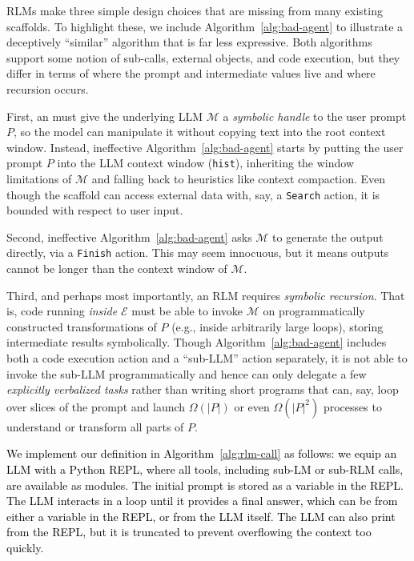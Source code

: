RLMs make three simple design choices that are missing from many existing scaffolds. To highlight these, we include Algorithm~\ref{alg:bad-agent} to illustrate a deceptively ``similar'' algorithm that is far less expressive. Both algorithms support some notion of sub-calls, external objects, and code execution, but they differ in terms of where the prompt and intermediate values live and where recursion occurs.

\begin{table}[htbp]
    \centering
    \begin{minipage}[t]{0.48\textwidth}
        
    \end{minipage}
    \hfill
    \begin{minipage}[t]{0.48\textwidth}
        
    \end{minipage}
\end{table}

First, an \RLM{} must give the underlying LLM $\mathcal{M}$ a \emph{symbolic handle} to the user prompt $P$, so the model can manipulate it without copying text into the root context window. Instead, ineffective Algorithm~\ref{alg:bad-agent} starts by putting the user prompt $P$ into the LLM context window (\texttt{hist}), inheriting the window limitations of $\mathcal{M}$ and falling back to heuristics like context compaction. Even though the scaffold can access external data with, say, a \texttt{Search} action, it is bounded with respect to user input.

Second, ineffective Algorithm~\ref{alg:bad-agent} asks $\mathcal{M}$ to generate the output directly, via a \texttt{Finish} action. This may seem innocuous, but it means outputs cannot be longer than the context window of $\mathcal{M}$.

Third, and perhaps most importantly, an RLM requires \emph{symbolic recursion}. That is, code running \emph{inside} $\mathcal{E}$ must be able to invoke $\mathcal{M}$ on programmatically constructed transformations of $P$ (e.g., inside arbitrarily large loops), storing intermediate results symbolically. Though Algorithm~\ref{alg:bad-agent} includes both a code execution action and a ``sub-LLM'' action separately, it is not able to invoke the sub-LLM programmatically and hence can only delegate a few \textit{explicitly verbalized tasks} rather than writing short programs that can, say, loop over slices of the prompt and launch $\Omega(|P|)$ or even $\Omega(|P|^2)$ processes to understand or transform all parts of $P$.

\textcolor{black}{We implement our \RLM{} definition in Algorithm~\ref{alg:rlm-call} as follows: we equip an LLM with a Python REPL, where all tools, including sub-LM or sub-RLM calls, are available as modules. The initial prompt is stored as a variable in the REPL. The LLM interacts in a loop until it provides a final answer, which can be from either a variable in the REPL, or from the LLM itself. The LLM can also print from the REPL, but it is truncated to prevent overflowing the context too quickly.}
